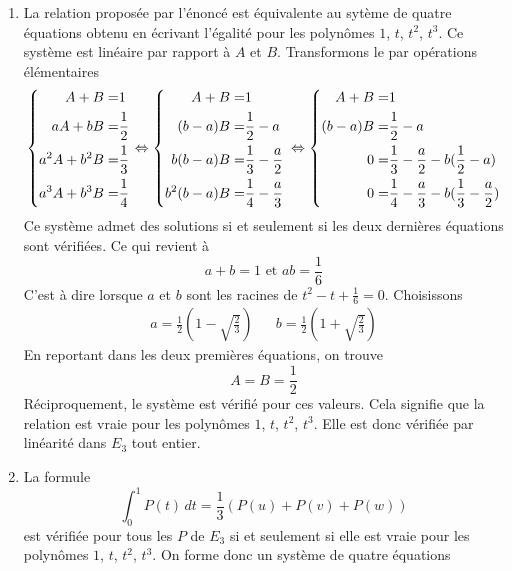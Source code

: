 \begin{enumerate}
\item La relation proposée par l'énoncé est équivalente au sytème de quatre équations obtenu en écrivant l'égalité pour les polynômes $1$, $t$, $t^{2}$, $t^{3}$.\newline
Ce système est linéaire par rapport à $A$ et $B$. Transformons le par opérations élémentaires
\begin{displaymath}
 \left\lbrace 
\begin{aligned}
  A+B =& 1\\
aA+bB =& \frac{1}{2}\\
a^{2}A+b^{2}B =& \frac{1}{3}\\
a^{3}A+b^{3}B =& \frac{1}{4}
\end{aligned}
\right. 
\Leftrightarrow
\left\lbrace 
\begin{aligned}
 A + B =& 1 \\
(b-a)B =& \frac{1}{2}-a\\
b(b-a)B =& \frac{1}{3}-\frac{a}{2}\\
b^{2}(b-a)B =& \frac{1}{4}-\frac{a}{3}
\end{aligned}
\right. 
\\
\Leftrightarrow
\left\lbrace 
\begin{aligned}
A + B =& 1 \\
(b-a)B =& \frac{1}{2}-a\\
0 =& \frac{1}{3}-\frac{a}{2}-b(\frac{1}{2}-a)\\
0 =& \frac{1}{4}-\frac{a}{3}-b(\frac{1}{3}-\frac{a}{2})
\end{aligned}
\right. 
\end{displaymath}
Ce système admet des solutions si et seulement si les deux dernières équations sont vérifiées. Ce qui revient à
\begin{displaymath}
 a+b=1 \text{ et } ab= \frac{1}{6} 
\end{displaymath}
 C'est à dire lorsque $a$ et $b$ sont les racines de $t^{2}-t+\frac{1}{6}=0$. Choisissons
\begin{align*}
 a=\frac{1}{2}(1-\sqrt{\frac{2}{3}}) & & b=\frac{1}{2}(1+\sqrt{\frac{2}{3}})
\end{align*}
En reportant dans les deux premières équations, on trouve  
$$A=B=\frac{1}{2}$$
Réciproquement, le système est vérifié pour ces valeurs. Cela signifie que la relation est vraie pour les polynômes $1$, $t$, $t^{2}$, $t^{3}$. Elle est donc vérifiée par linéarité dans $E_{3}$ tout entier.
\item La formule \[\int_{0}^{1}P(t)\,dt=\frac{1}{3}(P(u)+P(v)+P(w))\]
est vérifiée pour tous les $P$ de $E_{3}$ si et seulement si elle est vraie pour les polynômes $1$, $t$, $t^{2}$, $t^{3}$. On forme donc un système de quatre équations

\end{enumerate}
